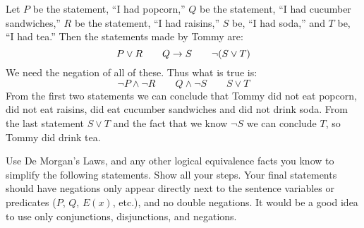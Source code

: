 \begin{questions}
\begin{solution}
Let $P$ be the statement, ``I had popcorn,'' $Q$ be the statement, ``I had cucumber sandwiches,'' $R$ be the statement, ``I had raisins,'' $S$ be, ``I had soda,'' and $T$ be, ``I had tea.''  Then the statements made by Tommy are:
\[P \vee R \qquad Q \rightarrow S \qquad \neg(S \vee T)\]
We need the negation of all of these.  Thus what is true is:
\[\neg P \wedge \neg R \qquad Q \wedge \neg S \qquad S \vee T\]
From the first two statements we can conclude that Tommy did not eat popcorn, did not eat raisins, did eat cucumber sandwiches and did not drink soda.  From the last statement $S \vee T$ and the fact that we know $\neg S$ we can conclude $T$, so Tommy did drink tea.
\end{solution}


\question Use De Morgan's Laws, and any other logical equivalence facts you know to simplify the following statements.  Show all your steps.  Your final statements should have negations only appear directly next to the sentence variables or predicates ($P$, $Q$, $E(x)$, etc.), and no double negations.  It would be a good idea to use only conjunctions, disjunctions, and negations.
\end{questions}
